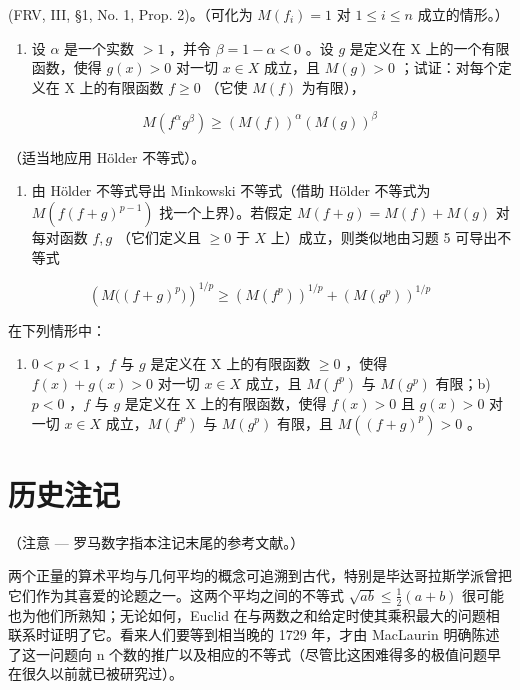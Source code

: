 (FRV, III, §1, No. 1, Prop. 2)。（可化为 \(M(f_i) = 1\) 对 \(1 \leqslant i \leqslant n\) 成立的情形。）

\begin{enumerate}
\def\labelenumi{\arabic{enumi})}
\setcounter{enumi}{4}
\tightlist
\item
  设 \(\alpha\) 是一个实数 \(>1\) ，并令 \(\beta = 1 - \alpha < 0\) 。设 \(g\) 是定义在 X 上的一个有限函数，使得 \(g(x) > 0\) 对一切 \(x \in X\) 成立，且 \(M(g) > 0\) ；试证：对每个定义在 X 上的有限函数 \(f \geqslant 0\) （它使 \(M(f)\) 为有限），
\end{enumerate}

\[
M (f ^ {\alpha} g ^ {\beta}) \geqslant (M (f)) ^ {\alpha} (M (g)) ^ {\beta}
\]

（适当地应用 Hölder 不等式）。

\begin{enumerate}
\def\labelenumi{\arabic{enumi})}
\setcounter{enumi}{5}
\tightlist
\item
  由 Hölder 不等式导出 Minkowski 不等式（借助 Hölder 不等式为 \(M(f(f + g)^{p-1})\) 找一个上界）。若假定 \(M(f + g) = M(f) + M(g)\) 对每对函数 \(f, g\) （它们定义且 \(\geqslant 0\) 于 \(X\) 上）成立，则类似地由习题 5 可导出不等式
\end{enumerate}

\[
\left(M \big ((f + g) ^ {p} \big)\right) ^ {1 / p} \geqslant \left(M (f ^ {p})\right) ^ {1 / p} + \left(M (g ^ {p})\right) ^ {1 / p}
\]

在下列情形中：

\begin{enumerate}
\def\labelenumi{\alph{enumi})}
\tightlist
\item
  \(0 < p < 1\) ，\(f\) 与 \(g\) 是定义在 X 上的有限函数 \(\geqslant 0\) ，使得 \(f(x) + g(x) > 0\) 对一切 \(x \in X\) 成立，且 \(M(f^p)\) 与 \(M(g^p)\) 有限；b) \(p < 0\) ，\(f\) 与 \(g\) 是定义在 X 上的有限函数，使得 \(f(x) > 0\) 且 \(g(x) > 0\) 对一切 \(x \in X\) 成立，\(M(f^p)\) 与 \(M(g^p)\) 有限，且 \(M((f + g)^p) > 0\) 。
\end{enumerate}

\chapter*{历史注记}
{}

（注意 --- 罗马数字指本注记末尾的参考文献。）

两个正量的算术平均与几何平均的概念可追溯到古代，特别是毕达哥拉斯学派曾把它们作为其喜爱的论题之一。这两个平均之间的不等式 \(\sqrt{ab} \leqslant \frac{1}{2}(a + b)\) 很可能也为他们所熟知；无论如何，Euclid 在与两数之和给定时使其乘积最大的问题相联系时证明了它。看来人们要等到相当晚的 1729 年，才由 MacLaurin 明确陈述了这一问题向 n 个数的推广以及相应的不等式（尽管比这困难得多的极值问题早在很久以前就已被研究过）。

